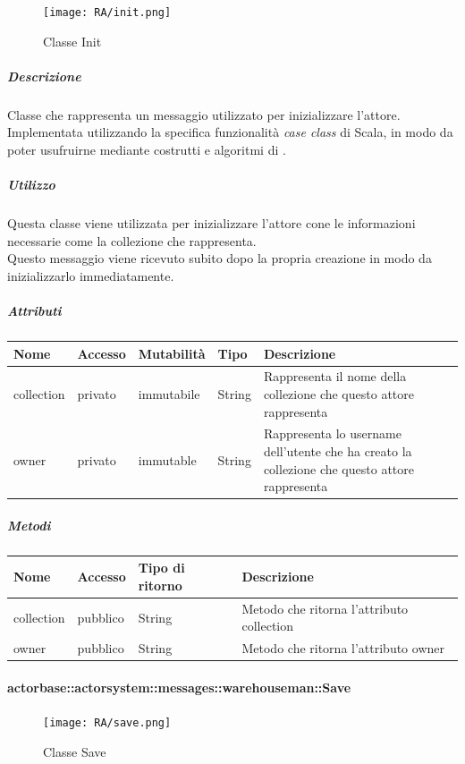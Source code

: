 \documentclass{scalatekids-article}
\begin{document}
\begin{figure}[H]
  \begin{center}
    \texttt{[image: RA/init.png]}
    \caption{Classe Init}
  \end{center}
\end{figure}

\subparagraph{Descrizione}
Classe che rappresenta un messaggio utilizzato per inizializzare l'attore.\\Implementata utilizzando la specifica funzionalità \textit{case class} di Scala,
in modo da poter usufruirne mediante costrutti e algoritmi di
.

\subparagraph{Utilizzo}
Questa classe viene utilizzata per inizializzare l'attore cone le informazioni
necessarie come la collezione che rappresenta.\\Questo messaggio viene
ricevuto subito dopo la propria creazione in modo da inizializzarlo immediatamente.

\subparagraph{Attributi}
\begin{tabular}{| p{2cm} | p{1.5cm} | p{2cm} | p{3cm} | p{8.5cm} |}
  \hline
  Nome & Accesso & Mutabilità & Tipo & Descrizione\\
  \hline
  collection & privato & immutabile & String & Rappresenta il nome della collezione che questo attore rappresenta\\
  \hline
  owner & privato & immutable & String & Rappresenta lo username dell'utente che ha creato la collezione che questo attore rappresenta\\
  \hline
\end{tabular}

\subparagraph{Metodi}
\begin{tabular}{| l | l | l | l |}
  \hline
  Nome & Accesso & Tipo di ritorno & Descrizione\\
  \hline
  collection & pubblico & String & Metodo che ritorna l'attributo collection\\
  \hline
  owner & pubblico & String & Metodo che ritorna l'attributo owner\\
  \hline
\end{tabular}

\paragraph{actorbase::actorsystem::messages::warehouseman::Save}
\label{sec:actorbase::actorsystem::messages::warehouseman::Save}

\begin{figure}[H]
  \begin{center}
    \texttt{[image: RA/save.png]}
    \caption{Classe Save}
  \end{center}
\end{figure}
\end{document}
